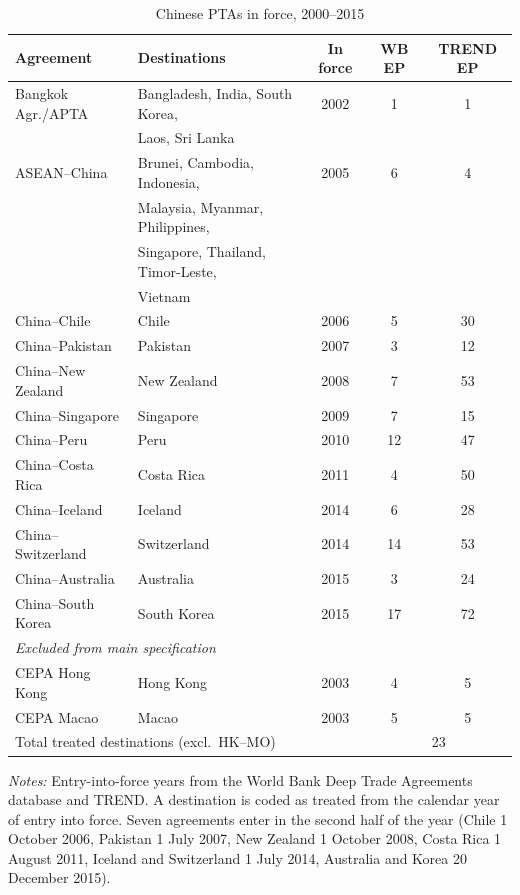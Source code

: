 \documentclass[12pt]{article}
\begin{document}
\begin{table}[htbp]
\centering
\caption{Chinese PTAs in force, 2000--2015}
\label{tab:treatment}
\small
\begin{threeparttable}
\begin{tabular}{llccc}
\toprule
Agreement & Destinations & In force & WB EP & TREND EP \\
\midrule
Bangkok Agr./APTA & Bangladesh, India, South Korea, & 2002 & 1 & 1 \\
                  & Laos, Sri Lanka & & & \\
\addlinespace
ASEAN--China & Brunei, Cambodia, Indonesia, & 2005 & 6 & 4 \\
             & Malaysia, Myanmar, Philippines, & & & \\
             & Singapore, Thailand, Timor-Leste, & & & \\
             & Vietnam & & & \\
\addlinespace
China--Chile & Chile & 2006 & 5 & 30 \\
China--Pakistan & Pakistan & 2007 & 3 & 12 \\
China--New Zealand & New Zealand & 2008 & 7 & 53 \\
China--Singapore & Singapore & 2009 & 7 & 15 \\
China--Peru & Peru & 2010 & 12 & 47 \\
China--Costa Rica & Costa Rica & 2011 & 4 & 50 \\
China--Iceland & Iceland & 2014 & 6 & 28 \\
China--Switzerland & Switzerland & 2014 & 14 & 53 \\
China--Australia & Australia & 2015 & 3 & 24 \\
China--South Korea & South Korea & 2015 & 17 & 72 \\
\midrule
\multicolumn{5}{l}{\textit{Excluded from main specification}} \\
CEPA Hong Kong & Hong Kong & 2003 & 4 & 5 \\
CEPA Macao & Macao & 2003 & 5 & 5 \\
\midrule
\multicolumn{3}{l}{Total treated destinations (excl.\ HK--MO)} & \multicolumn{2}{c}{23} \\
\bottomrule
\end{tabular}
\begin{tablenotes}\footnotesize
\item \emph{Notes:} Entry-into-force years from the World Bank Deep Trade Agreements database and TREND. A destination is coded as treated from the calendar year of entry into force. Seven agreements enter in the second half of the year (Chile 1 October 2006, Pakistan 1 July 2007, New Zealand 1 October 2008, Costa Rica 1 August 2011, Iceland and Switzerland 1 July 2014, Australia and Korea 20 December 2015).

\end{tablenotes}
\end{threeparttable}
\end{table}
\end{document}
